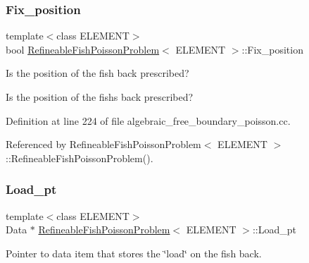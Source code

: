 \mbox{\label{classRefineableFishPoissonProblem_a51c10ea7cbf4ab61fd953f011f72a1c4}} 
\subsubsection{\texorpdfstring{Fix\+\_\+position}{Fix\_position}}
{\footnotesize\ttfamily template$<$class E\+L\+E\+M\+E\+NT$>$ \\
bool \hyperlink{classRefineableFishPoissonProblem}{Refineable\+Fish\+Poisson\+Problem}$<$ E\+L\+E\+M\+E\+NT $>$\+::Fix\+\_\+position\hspace{0.3cm}{\ttfamily [private]}}



Is the position of the fish back prescribed? 

Is the position of the fish\textquotesingle{}s back prescribed? 

Definition at line 224 of file algebraic\+\_\+free\+\_\+boundary\+\_\+poisson.\+cc.



Referenced by Refineable\+Fish\+Poisson\+Problem$<$ E\+L\+E\+M\+E\+N\+T $>$\+::\+Refineable\+Fish\+Poisson\+Problem().

\mbox{\label{classRefineableFishPoissonProblem_a9a9ce82a4308be486701578134d06210}} 
\subsubsection{\texorpdfstring{Load\+\_\+pt}{Load\_pt}}
{\footnotesize\ttfamily template$<$class E\+L\+E\+M\+E\+NT$>$ \\
Data $\ast$ \hyperlink{classRefineableFishPoissonProblem}{Refineable\+Fish\+Poisson\+Problem}$<$ E\+L\+E\+M\+E\+NT $>$\+::Load\+\_\+pt\hspace{0.3cm}{\ttfamily [private]}}



Pointer to data item that stores the \char`\"{}load\char`\"{} on the fish back. 



